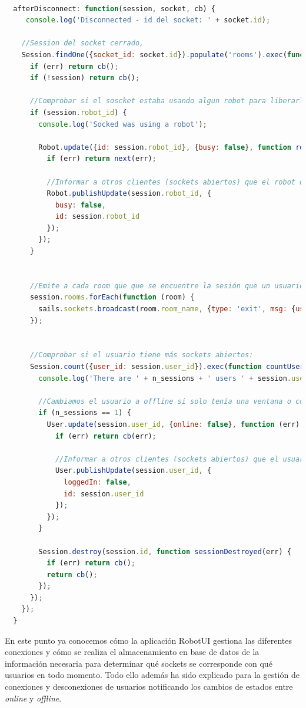 \begin{lstlisting}[language=JavaScript]

  afterDisconnect: function(session, socket, cb) {
     console.log('Disconnected - id del socket: ' + socket.id);

    //Session del socket cerrado,
    Session.findOne({socket_id: socket.id}).populate('rooms').exec(function (err, session) {
      if (err) return cb();
      if (!session) return cb();

      //Comprobar si el soscket estaba usando algun robot para liberarlo:
      if (session.robot_id) {
        console.log('Socked was using a robot');

        Robot.update({id: session.robot_id}, {busy: false}, function robotUpdated(err) {
          if (err) return next(err);

          //Informar a otros clientes (sockets abiertos) que el robot queda liberado
          Robot.publishUpdate(session.robot_id, {
            busy: false,
            id: session.robot_id
          });
        });
      }


      //Emite a cada room que que se encuentre la sesión que un usuario la ha abandonado ->  
      session.rooms.forEach(function (room) {
        sails.sockets.broadcast(room.room_name, {type: 'exit', msg: {user_id: session.user_id}});
      });


      //Comprobar si el usuario tiene más sockets abiertos:
      Session.count({user_id: session.user_id}).exec(function countUserSessions(error, n_sessions) {
        console.log('There are ' + n_sessions + ' users ' + session.user_id);

        //Cambiamos el usuario a offline si solo tenía una ventana o conexión abierta.
        if (n_sessions == 1) {
          User.update(session.user_id, {online: false}, function (err) {
            if (err) return cb(err);

            //Informar a otros clientes (sockets abiertos) que el usuario ya NO se encuentra logueado
            User.publishUpdate(session.user_id, {
              loggedIn: false,
              id: session.user_id
            });
          });
        }

        Session.destroy(session.id, function sessionDestroyed(err) {
          if (err) return cb();
          return cb();
        });
      });
    });
  }

\end{lstlisting}
  
 
 En este punto ya conocemos cómo la aplicación RobotUI gestiona las diferentes conexiones y cómo se realiza el almacenamiento en base de datos de la información necesaria para determinar qué sockets se 
 corresponde con qué usuarios en todo momento. Todo ello además ha sido explicado para la gestión de conexiones y desconexiones de usuarios notificando los cambios de estados entre \emph{online} y \emph{offline}.\\
 
